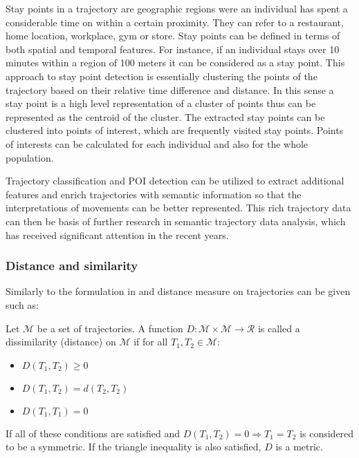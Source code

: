 Stay points in a trajectory are geographic regions were an individual has spent a considerable time on within a certain proximity. They can refer to a restaurant, home location, workplace, gym or store. Stay points can be defined in terms of both spatial and temporal features. For instance, if an individual stays over 10 minutes within a region of 100 meters it can be considered as a stay point. This approach to stay point detection is essentially clustering the points of the trajectory based on their relative time difference and distance. In this sense a stay point is a high level representation of a cluster of points thus can be represented as the centroid of the cluster.  The extracted stay points can be clustered into points of interest, which are frequently visited stay points. Points of interests can be calculated for each individual and also for the whole population. \cite{mobility-cdr4, traj-datamining-overview}

Trajectory classification and POI detection can be utilized to extract additional features and enrich trajectories with semantic information so that the interpretations of movements can be better represented. This rich trajectory data can then be basis of further research in semantic trajectory data analysis, which has received significant attention in the recent years. \cite{traj-semantic, traj-semantic2}


\subsubsection{Distance and similarity}
Similarly to the formulation in \cite{encyclopedia} and \cite{distance-def}  distance measure on trajectories can be given such as:

\begin{definition}
Let $\mathcal{M}$ be a set of trajectories. A function $D :\mathcal{M} \times \mathcal{M} \rightarrow \mathcal{R}$ is called a dissimilarity (distance) on $\mathcal{M}$ if for all $T_{1}, T_{2} \in \mathcal{M}$: 
\begin{itemize}
    \item $D(T_{1},T_{2}) \geqslant 0$
    \item $D(T_{1},T_{2}) = d(T_{2},T_{2})$
    \item $D(T_{1},T_{1}) = 0$
\end{itemize}
If all of these conditions are satisfied and $D(T_{1}, T_{2}) = 0 \Rightarrow  T_{1} = T_{2} $ is considered to be a symmetric. If
the triangle inequality is also satisfied, $D$ is a metric.
\end{definition}

